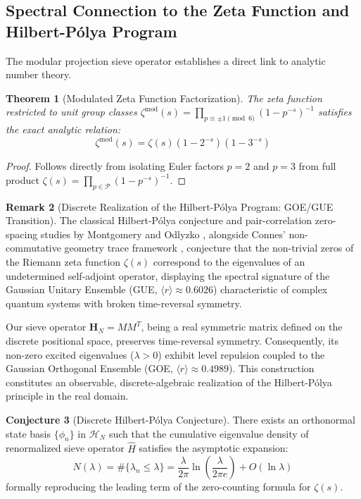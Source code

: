 \documentclass{article}
\numberwithin{equation}{section}
\theoremstyle{plain}
\newtheorem{theorem}{Theorem}[section]
\theoremstyle{definition}
\newtheorem{remark}[theorem]{Remark}
\newtheorem{conjecture}[theorem]{Conjecture}
\begin{document}
\subsection{Spectral Connection to the Zeta Function and Hilbert-Pólya Program}

The modular projection sieve operator establishes a direct link to analytic number theory.

\begin{theorem}[Modulated Zeta Function Factorization]
\label{thm:euleriano-restringido}
The zeta function restricted to unit group classes $\zeta^{\text{mod}}(s) = \prod_{p \equiv \pm 1 \pmod 6} (1 - p^{-s})^{-1}$ satisfies the exact analytic relation:
\begin{equation}
\zeta^{\text{mod}}(s) = \zeta(s) \left(1 - 2^{-s}\right) \left(1 - 3^{-s}\right)
\end{equation}
\end{theorem}

\begin{proof}
Follows directly from isolating Euler factors $p=2$ and $p=3$ from full product $\zeta(s) = \prod_{p \in \mathcal{P}} (1 - p^{-s})^{-1}$.
\end{proof}

\begin{remark}[Discrete Realization of the Hilbert-Pólya Program: GOE/GUE Transition]
\label{rem:hilbert-polya-goe}
The classical Hilbert-Pólya conjecture and pair-correlation zero-spacing studies by Montgomery and Odlyzko \cite{Montgomery1973, Odlyzko1987}, alongside Connes' non-commutative geometry trace framework \cite{Connes1999}, conjecture that the non-trivial zeros of the Riemann zeta function $\zeta(s)$ correspond to the eigenvalues of an undetermined self-adjoint operator, displaying the spectral signature of the Gaussian Unitary Ensemble (GUE, $\langle r \rangle \approx 0.6026$) characteristic of complex quantum systems with broken time-reversal symmetry.

Our sieve operator $\mathbf{H}_N = M M^T$, being a real symmetric matrix defined on the discrete positional space, preserves time-reversal symmetry. Consequently, its non-zero excited eigenvalues ($\lambda > 0$) exhibit level repulsion coupled to the Gaussian Orthogonal Ensemble (GOE, $\langle r \rangle \approx 0.4989$). This construction constitutes an observable, discrete-algebraic realization of the Hilbert-Pólya principle in the real domain.
\end{remark}

\begin{conjecture}[Discrete Hilbert-Pólya Conjecture]
\label{conj:hilbert-polya-discreto}
There exists an orthonormal state basis $\{\phi_n\}$ in $\mathcal{H}_N$ such that the cumulative eigenvalue density of renormalized sieve operator $\hat{H}$ satisfies the asymptotic expansion:
\begin{equation}
N(\lambda) = \#\{\lambda_n \le \lambda\} = \frac{\lambda}{2\pi} \ln\left(\frac{\lambda}{2\pi e}\right) + O(\ln \lambda)
\end{equation}
formally reproducing the leading term of the zero-counting formula for $\zeta(s)$.
\end{conjecture}
\end{document}
